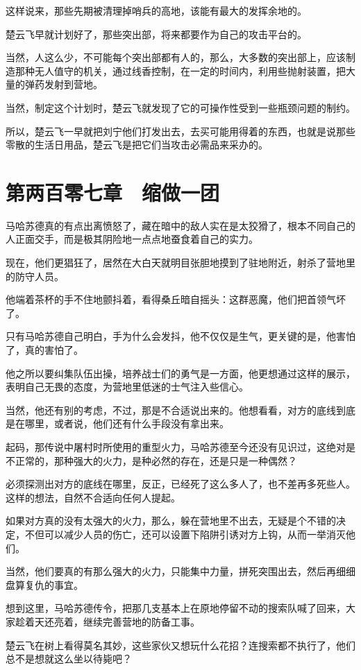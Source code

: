 这样说来，那些先期被清理掉哨兵的高地，该能有最大的发挥余地的。

楚云飞早就计划好了，那些突出部，将来都要作为自己的攻击平台的。

当然，人这么少，不可能每个突出部都有人的，那么，大多数的突出部上，应该制造那种无人值守的机关，通过线香控制，在一定的时间内，利用些抛射装置，把大量的弹药发射到营地。

当然，制定这个计划时，楚云飞就发现了它的可操作性受到一些瓶颈问题的制约。

所以，楚云飞一早就把刘宁他们打发出去，去买可能用得着的东西，也就是说那些零散的生活日用品，楚云飞是把它们当攻击必需品来采办的。

\section{第两百零七章　缩做一团}

马哈苏德真的有点出离愤怒了，藏在暗中的敌人实在是太狡猾了，根本不同自己的人正面交手，而是极其阴险地一点点地蚕食着自己的实力。

现在，他们更猖狂了，居然在大白天就明目张胆地摸到了驻地附近，射杀了营地里的防守人员。

他端着茶杯的手不住地颤抖着，看得桑丘暗自摇头：这群恶魔，他们把首领气坏了。

只有马哈苏德自己明白，手为什么会发抖，他不仅仅是生气，更关键的是，他害怕了，真的害怕了。

他之所以要纠集队伍出操，培养战士们的勇气是一方面，他更想通过这样的展示，表明自己无畏的态度，为营地里低迷的士气注入些信心。

当然，他还有别的考虑，不过，那是不合适说出来的。他想看看，对方的底线到底是在哪里，或者说，他们还有什么手段没有拿出来。

起码，那传说中屠村时所使用的重型火力，马哈苏德至今还没有见识过，这绝对是不正常的，那种强大的火力，是种必然的存在，还是只是一种偶然？

必须探测出对方的底线在哪里，反正，已经死了这么多人了，也不差再多死些人。这样的想法，自然不合适向任何人提起。

如果对方真的没有太强大的火力，那么，躲在营地里不出去，无疑是个不错的决定，不但可以减少人员的伤亡，还可以设置下陷阱引诱对方上钩，从而一举消灭他们。

当然，他们要真的有那么强大的火力，只能集中力量，拼死突围出去，然后再细细盘算复仇的事宜。

想到这里，马哈苏德传令，把那几支基本上在原地停留不动的搜索队喊了回来，大家趁着天还亮着，继续完善营地的防备工事。

楚云飞在树上看得莫名其妙，这些家伙又想玩什么花招？连搜索都不执行了，他们总不是想就这么坐以待毙吧？

